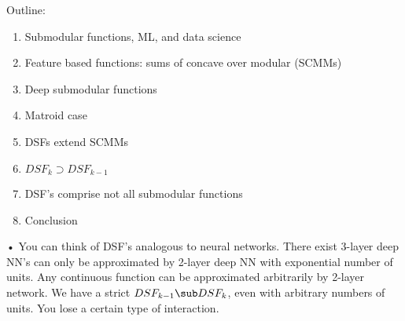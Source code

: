 Outline:
\begin{enumerate}
\item
Submodular functions, ML, and data science
\item
Feature based functions: sums of concave over modular (SCMMs)
\item
Deep submodular functions
\item
Matroid case
\item
DSFs extend SCMMs
\item
$DSF_k\supset DSF_{k-1}$
\item
DSF's comprise not all submodular functions
\item
Conclusion
\end{enumerate}•
You can think of DSF's analogous to neural networks. There exist 3-layer deep NN's can only be approximated by 2-layer deep NN with exponential number of units.  Any continuous function can be approximated arbitrarily by 2-layer network.
We have a strict $DSF_{k-1}\sub DSF_k$, even with arbitrary numbers of units. You lose a certain type of interaction. 



